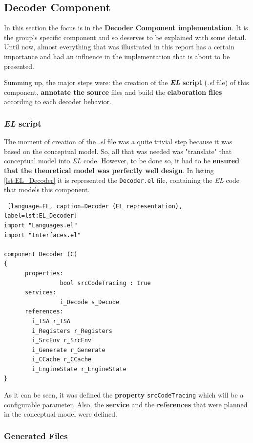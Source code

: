 \documentclass[12pt]{article}
\begin{document}
{\subsection{Decoder Component}

In this section the focus is in the \textbf{Decoder Component implementation}. It is the group's specific component and so deserves to be explained with some detail. Until now, almost everything that was illustrated in this report has a certain importance and had an influence in the implementation that is about to be presented.

Summing up, the major steps were: the creation of the \textbf{\textit{EL} script} (\textit{.el} file) of this component,\textbf{ annotate the source} files and build the \textbf{elaboration files} according to each decoder behavior. 

\subsubsection{\textit{EL} script}

The moment of creation of the \textit{.el} file was a quite trivial step because it was based on the conceptual model. So, all that was needed was "translate" that conceptual model into \textit{EL} code. However, to be done so, it had to be \textbf{ensured that the theoretical model was perfectly well design}. In listing \ref{lst:EL_Decoder} it is represented the \texttt{Decoder.el} file, containing the \textit{EL} code that models this component.

\begin{lstlisting} [language=EL, caption=Decoder (EL representation), label=lst:EL_Decoder]
import "Languages.el"
import "Interfaces.el"

component Decoder (C)
{
      properties:
      			bool srcCodeTracing : true
      services:
      			i_Decode s_Decode
      references:
        i_ISA r_ISA
        i_Registers r_Registers
        i_SrcEnv r_SrcEnv
        i_Generate r_Generate
        i_CCache r_CCache
        i_EngineState r_EngineState
}
\end{lstlisting}

As it can be seen, it was defined the \textbf{property} \texttt{srcCodeTracing} which will be a configurable parameter. Also, the \textbf{service} and the \textbf{references} that were planned in the conceptual model were defined.


\subsubsection{Generated Files}

}
\end{document}
